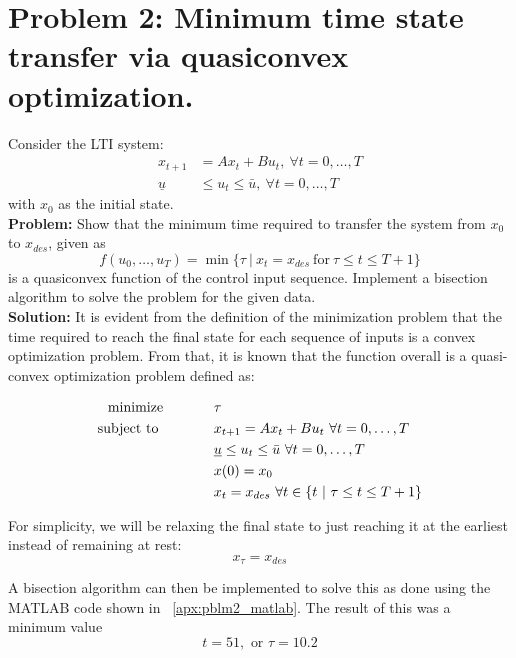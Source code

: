 \documentclass[letter]{article}
\newcommand{\optpblm}[3][eq:default]{
	\begin{equation}\label{#1}
		\begin{aligned}
			\text{minimize} \hspace{0.5in} &#2\vspace{5pt}\\
			\text{subject to \hspace{0.5in}} &#3
		\end{aligned}	
	\end{equation}
}
\begin{document}
\newpage
\section{Problem 2: Minimum time state transfer via quasiconvex optimization.}
Consider the LTI system:
\begin{equation}\label{eq:quasiconvex_opt_def}
	\begin{aligned}
		x_{t+1} &= Ax_t + B u_t, \ \forall t = 0,\dots,T\\
		\underline{u} &\leq u_t \leq \bar{u}, \ \forall t = 0,\dots,T
	\end{aligned}
\end{equation}
with $x_0$ as the initial state.\\

\textbf{Problem:}
Show that the minimum time required to transfer the system from $x_0$ to $x_{des}$, given as
\begin{equation}\label{eq:qualiconvex_problem_result}
	f(u_0,\dots,u_T) = \min \{\tau \ | \ x_t = x_{des} \ \text{for} \ \tau \leq t \leq {T+1}\}
\end{equation}
is a quasiconvex function of the control input sequence. Implement a bisection algorithm to solve the problem for the given data.\\

\textbf{Solution:}
It is evident from the definition of the minimization problem that the time required to reach the final state for each sequence of inputs is a convex optimization problem. From that, it is known that the function overall is a quasi-convex optimization problem defined as:
\optpblm{\tau}{
	x_{t+1} = Ax_t + B u_t \ \forall t = 0,\dots,T\\
	&\underline{u} \leq u_t \leq \bar{u} \ \forall t = 0,\dots,T\\
	&x(0) = x_0\\
	&x_t = x_{des} \ \forall t \in \{t \ | \ \tau \leq t \leq {T+1}\}
	}

For simplicity, we will be relaxing the final state to just reaching it at the earliest instead of remaining at rest:
$$x_\tau = x_{des}$$

A bisection algorithm can then be implemented to solve this as done using the MATLAB code shown in \appendixname \ \ref{apx:pblm2_matlab}. The result of this was a minimum value $$t = 51, \text{ or } \tau = 10.2$$
\end{document}
